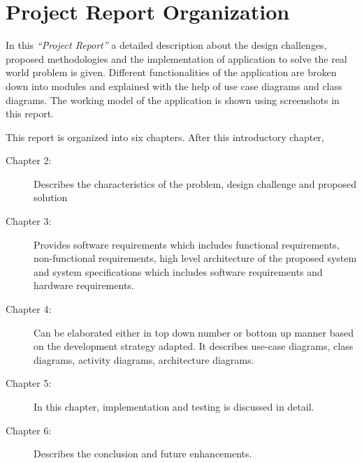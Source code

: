 \documentclass[../Report.tex]{subfiles}
\begin{document}
\section{Project Report Organization}

In this \textit{``Project Report''} a detailed description about the design challenges, proposed methodologies and the implementation of 
application to solve the real world problem is given. Different functionalities of the application are broken down into modules and 
explained with the help of use case diagrams and class diagrams. The working model of the application is shown using screenshots in this 
report.\par

\noindent
This report is organized into six chapters. After this introductory chapter,
\begin{description}
    \item[Chapter 2:] Describes the characteristics of the problem, design challenge and proposed solution
    
    \item[Chapter 3:] Provides software requirements which includes functional requirements, non-functional requirements, 
    high level architecture of the proposed system and system specifications which includes software requirements and hardware requirements.
    
    \item[Chapter 4:] Can be elaborated either in top down number or bottom up manner based on the development strategy adapted. 
    It describes use-case diagrams, class diagrams, activity diagrams, architecture diagrams.
    
    \item[Chapter 5:] In this chapter, implementation and testing is discussed in detail.
    
    \item[Chapter 6:] Describes the conclusion and future enhancements.
\end{description}
\end{document}
